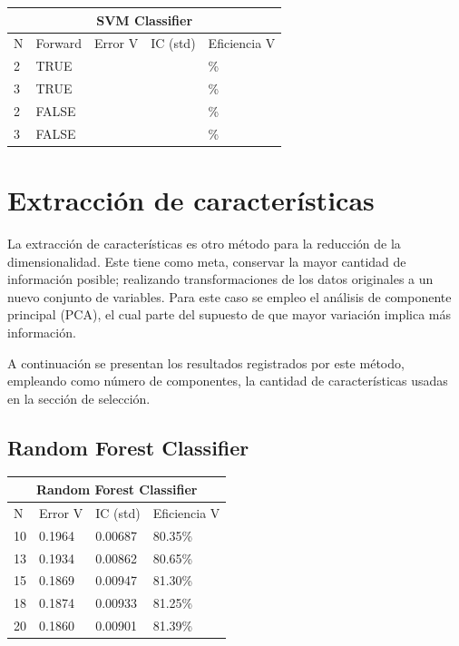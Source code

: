 \documentclass[conference]{IEEEtran}
\begin{document}
\begin{table}[h]
\centering
\begin{tabular}{lllll}
\hline
\multicolumn{5}{c}{\textbf{SVM Classifier}} \\ \hline
N & Forward & Error V & IC (std) & Eficiencia V \\ \hline
2 & TRUE &  &   & \% \\
3 & TRUE &  &   & \% \\
2 & FALSE & &  & \% \\
3 & FALSE &  & & \% \\ \hline
\end{tabular}
\end{table}

\section{Extracción de características}
La extracción de características es otro método para la reducción de la dimensionalidad. Este tiene como meta, conservar la mayor cantidad de información posible; realizando transformaciones de los datos originales a un nuevo conjunto de variables. Para este caso se empleo el análisis de componente principal (PCA), el cual parte del supuesto de que mayor variación implica más información.

A continuación se presentan los resultados registrados por este método, empleando como número de componentes, la cantidad de características usadas en la sección de selección.

\subsection{Random Forest Classifier}\hfill
\begin{table}[h]
\centering
\begin{tabular}{llll}
\hline
\multicolumn{4}{c}{\textbf{Random Forest Classifier}} \\ \hline
N & Error V & IC (std) & Eficiencia V \\ \hline
10 & 0.1964 & 0.00687 & 80.35\% \\
13 & 0.1934 & 0.00862 & 80.65\% \\
15 & 0.1869 & 0.00947 & 81.30\% \\
18 & 0.1874 & 0.00933 & 81.25\% \\
20 & 0.1860 & 0.00901 & 81.39\% \\\hline
\end{tabular}
\end{table}
\end{document}
